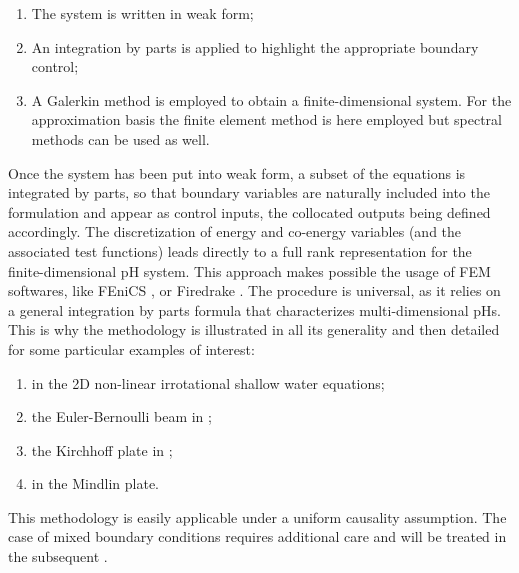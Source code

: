 \begin{enumerate}
	\item The system is written in weak form; 
	\item An integration by parts is applied to highlight the appropriate boundary control;
	\item A Galerkin method is employed to obtain a finite-dimensional system. For the approximation basis the finite element method is here employed but spectral methods can be used as well.
\end{enumerate}

Once the system has been put into weak form, a subset of the equations is integrated by parts, so that boundary variables are naturally included into the formulation and appear as control inputs, the collocated outputs being defined accordingly. The discretization of energy and co-energy variables (and the associated test functions) leads directly to a full rank representation for the finite-dimensional pH system.  This approach makes possible the usage of FEM softwares, like FEniCS \cite{logg2012}, or Firedrake \cite{rathgeber2017firedrake}. The procedure is universal, as it relies on a general integration by parts formula that characterizes multi-dimensional pHs. This is why the methodology is illustrated in all its generality and then detailed for some particular examples of interest:
\begin{enumerate}
	\item in  the 2D non-linear irrotational shallow water equations;
	\item the Euler-Bernoulli beam in ;
	\item the Kirchhoff plate in  ;
	\item in  the Mindlin plate.
\end{enumerate}

This methodology is easily applicable under a uniform causality assumption. The case of mixed boundary conditions requires additional care and will be treated in the subsequent .


